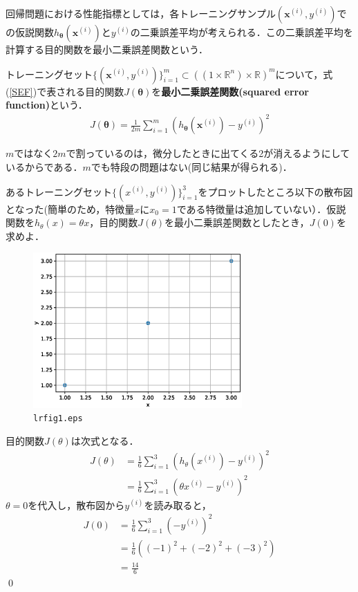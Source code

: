 回帰問題における性能指標としては，各トレーニングサンプル$({\bm x}^{(i)},y^{(i)})$での仮説関数$h_{{\bm \theta}}({\bm x}^{(i)})$と$y^{(i)}$の二乗誤差平均が考えられる．この二乗誤差平均を計算する目的関数を最小二乗誤差関数という．

\begin{defi}[最小二乗誤差関数]
トレーニングセット$\{({\bm x}^{(i)},y^{(i)})\}_{i=1}^m \subset ((1 \times \mathbb{R}^n) \times \mathbb{R})^m$について，式(\ref{SEF})で表される目的関数$J({\bm \theta})$を{\bf 最小二乗誤差関数(squared error function)}という．
\begin{align}
J({\bm \theta}) = \frac{1}{2m}\sum_{i=1}^m (h_{{\bm \theta}}({\bm x}^{(i)})-y^{(i)})^2 \label{SEF}
\end{align}
\end{defi}

\begin{rem}
$m$ではなく$2m$で割っているのは，微分したときに出てくる2が消えるようにしているからである．$m$でも特段の問題はない(同じ結果が得られる)．
\end{rem}

\begin{qu}
あるトレーニングセット$\{(x^{(i)},y^{(i)})\}_{i=1}^3$をプロットしたところ以下の散布図となった(簡単のため，特徴量$x$に$x_0=1$である特徴量は追加していない）．仮説関数を$h_{\theta}(x)=\theta x$，目的関数$J(\theta)$を最小二乗誤差関数としたとき，$J(0)$を求めよ．
\vspace{-10pt}
\begin{figure}[H]
\begin{center}
\includegraphics[width=8.0cm]{code/lrfig1.eps}
\vspace{-10pt}
\caption{\texttt{lrfig1.eps}}
\end{center}
\end{figure}
\vspace{-25pt}
\end{qu}
\begin{ans}
目的関数$J(\theta)$は次式となる．
\begin{align*}
J(\theta)&=\frac{1}{6}\sum_{i=1}^3 (h_{\theta}(x^{(i)})-y^{(i)})^2 \\
&=\frac{1}{6}\sum_{i=1}^3 (\theta x^{(i)}-y^{(i)})^2
\end{align*}
$\theta =0$を代入し，散布図から$y^{(i)}$を読み取ると，
\begin{align*}
J(0)&=\frac{1}{6}\sum_{i=1}^3 (-y^{(i)})^2 \\
&=\frac{1}{6}((-1)^2+(-2)^2+(-3)^2) \\
&= \frac{14}{6}
\end{align*}
\qed
\end{ans}

